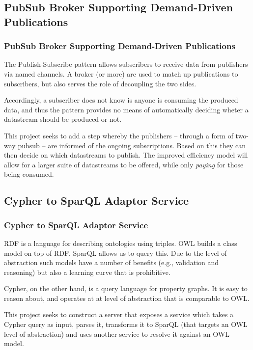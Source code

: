 \subsection{PubSub Broker Supporting Demand-Driven Publications}
\begin{frame}
    \frametitle{PubSub Broker Supporting Demand-Driven Publications}
    \vspace{3mm}
    The Publish-Subscribe pattern allows subscribers to receive data from publishers via named channels. A broker (or more) are used to match up publications to subscribers, but also serves the role of decoupling the two sides.
    
    \vspace{5mm}
    Accordingly, a subscriber does not know is anyone is consuming the produced data, and thus the pattern provides no means of automatically deciding wheter a datastream should be produced or not.
    
    \vspace{5mm}
    This project seeks to add a step whereby the publishers -- through a form of two-way pubsub -- are informed of the ongoing subscriptions. Based on this they can then decide on which datastreams to publish. The improved efficiency model will allow for a larger suite of datastreams to be offered, while only \textsl{paying} for those being consumed.

\end{frame}

\subsection{Cypher to SparQL Adaptor Service}
\begin{frame}
    \frametitle{Cypher to SparQL Adaptor Service}
    \vspace{3mm}
    RDF is a language for describing ontologies using triples. OWL builds a class model on top of RDF. SparQL allows us to query this. Due to the level of abstraction such models have a number of benefits (e.g., validation and reasoning) but also a learning curve that is prohibitive.
    
    \vspace{5mm}
    Cypher, on the other hand, is a query language for property graphs. It is easy to reason about, and operates at at level of abstraction that is comparable to OWL.
    
    \vspace{5mm}
    This project seeks to construct a server that exposes a service which takes a Cypher query as input, parses it, transforms it to SparQL (that targets an OWL level of abstraction) and uses another service to resolve it against an OWL model.
\end{frame}


